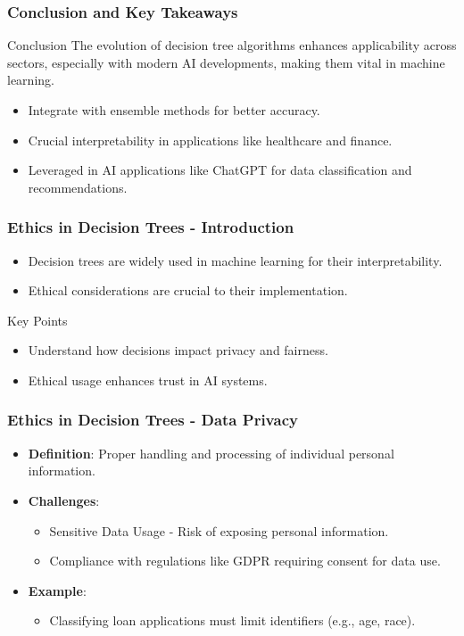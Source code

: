 \documentclass[aspectratio=169]{beamer}
\begin{document}
\begin{frame}[fragile]
    \frametitle{Conclusion and Key Takeaways}
    \begin{block}{Conclusion}
        The evolution of decision tree algorithms enhances applicability across sectors, especially with modern AI developments, making them vital in machine learning.
    \end{block}
    \begin{itemize}
        \item Integrate with ensemble methods for better accuracy.
        \item Crucial interpretability in applications like healthcare and finance.
        \item Leveraged in AI applications like ChatGPT for data classification and recommendations.
    \end{itemize}
\end{frame}

\begin{frame}[fragile]
    \frametitle{Ethics in Decision Trees - Introduction}
    \begin{itemize}
        \item Decision trees are widely used in machine learning for their interpretability.
        \item Ethical considerations are crucial to their implementation.
    \end{itemize}
    \begin{block}{Key Points}
        \begin{itemize}
            \item Understand how decisions impact privacy and fairness.
            \item Ethical usage enhances trust in AI systems.
        \end{itemize}
    \end{block}
\end{frame}

\begin{frame}[fragile]
    \frametitle{Ethics in Decision Trees - Data Privacy}
    \begin{itemize}
        \item \textbf{Definition}: Proper handling and processing of individual personal information.
        \item \textbf{Challenges}:
        \begin{itemize}
            \item Sensitive Data Usage - Risk of exposing personal information.
            \item Compliance with regulations like GDPR requiring consent for data use.
        \end{itemize}
        \item \textbf{Example}: 
        \begin{itemize}
            \item Classifying loan applications must limit identifiers (e.g., age, race).
        \end{itemize}
    \end{itemize}
\end{frame}
\end{document}
